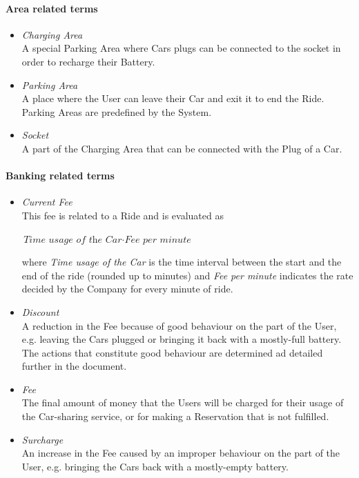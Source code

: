 \paragraph{Area related terms}
\begin{itemize}
	\item \emph{Charging Area} \\		
	A special Parking Area where Cars plugs can be connected to the socket in order to recharge their Battery.	
	
	\item \emph{Parking Area}\\
	A place where the User can leave their Car and exit it to end the Ride. Parking Areas are predefined by the System.
	
	\item \emph{Socket}\\
	A part of the Charging Area that can be connected with the Plug of a Car. 
\end{itemize}

\paragraph{Banking related terms}
\begin{itemize}
	\item \emph{Current Fee}\\
	This fee is related to a Ride and is evaluated as 
		
	$\textit{Time usage of the Car} \cdot \textit{Fee per minute}$ 
		
	where \textit{Time usage of the Car} is the time interval between the start and the end of the ride (rounded up to minutes) and \textit{Fee per minute} indicates the rate decided by the Company for every minute of ride.
		
	\item \emph{Discount} \\
	A reduction in the Fee because of good behaviour on the part of the User, e.g. leaving the Cars plugged or bringing it back with a mostly-full battery. The actions that constitute good behaviour are determined ad detailed further in the document.
	
	\item \emph{Fee}\\
	The final amount of money that the Users will be charged for their usage of the Car-sharing service, or for making a Reservation that is not fulfilled.
			
	\item \emph{Surcharge}\\
	An increase in the Fee caused by an improper behaviour on the part of the User, e.g. bringing the Cars back with a mostly-empty battery.
\end{itemize}


